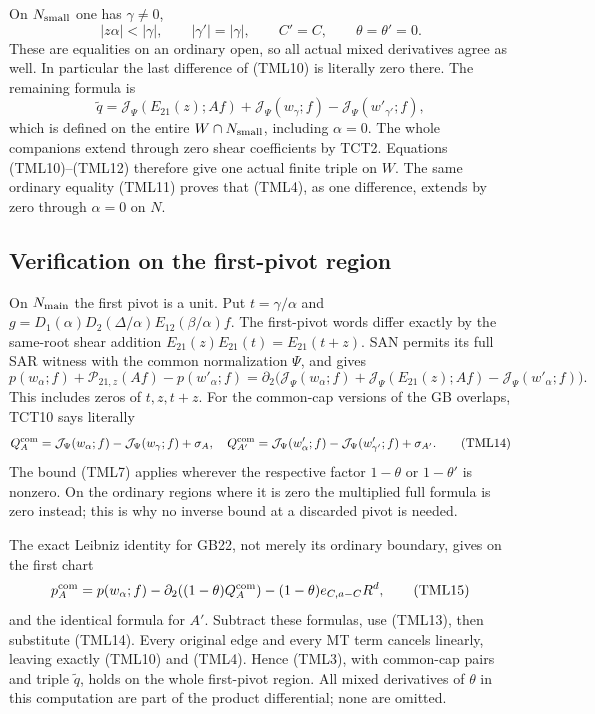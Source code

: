 On $N_{\rm small}$ one has $\gamma\ne0$,
\[
       |z\alpha|<|\gamma|,\qquad
       |\gamma'|=|\gamma|,\qquad C'=C,\qquad
                          \theta=\theta'=0.
 \tag{TML11}
\]
These are equalities on an ordinary open, so all actual mixed
derivatives agree as well.  In particular the last difference
of (TML10) is literally zero there.  The remaining formula is
\[
  \widetilde q=\mathcal J_\Psi(E_{21}(z);Af)
                  +\mathcal J_\Psi(w_\gamma;f)
                  -\mathcal J_\Psi(w'_{\gamma'};f),
 \tag{TML12}
\]
which is defined on the entire $W\cap N_{\rm small}$, including
$\alpha=0$.  The whole companions extend through zero shear
coefficients by TCT2.  Equations (TML10)--(TML12) therefore give
one actual finite triple on $W$.  The same ordinary equality
(TML11) proves that (TML4), as one difference, extends by zero
through $\alpha=0$ on $N$.

\subsection{Verification on the first-pivot region}

On $N_{\rm main}$ the first pivot is a unit.  Put
$t=\gamma/\alpha$ and
$g=D_1(\alpha)D_2(\Delta/\alpha)E_{12}(\beta/\alpha)f$.
The first-pivot words differ exactly by the same-root shear
addition $E_{21}(z)E_{21}(t)=E_{21}(t+z)$.  SAN permits its
full SAR witness with the common normalization $\Psi$, and gives
\[
 p(w_\alpha;f)+\mathcal P_{21,z}(Af)-p(w'_{\alpha};f)
   =\partial_2\bigl(\mathcal J_\Psi(w_\alpha;f)
          +\mathcal J_\Psi(E_{21}(z);Af)
          -\mathcal J_\Psi(w'_{\alpha};f)\bigr).
 \tag{TML13}
\]
This includes zeros of $t,z,t+z$.  For the common-cap versions
of the GB overlaps, TCT10 says literally
\[
 Q_A^{\rm com}=\mathcal J_\Psi(w_\alpha;f)
                   -\mathcal J_\Psi(w_\gamma;f)+\sigma_A,
 \quad
 Q_{A'}^{\rm com}=\mathcal J_\Psi(w'_{\alpha};f)
                   -\mathcal J_\Psi(w'_{\gamma'};f)+\sigma_{A'}.
 \tag{TML14}
\]
The bound (TML7) applies wherever the respective factor
$1-\theta$ or $1-\theta'$ is nonzero.  On the ordinary regions
where it is zero the multiplied full formula is zero instead;
this is why no inverse bound at a discarded pivot is needed.

The exact Leibniz identity for GB22, not merely its ordinary
boundary, gives on the first chart
\[
 p_A^{\rm com}=p(w_\alpha;f)
       -\partial_2((1-\theta)Q_A^{\rm com})
       -(1-\theta)e_{C,a-C}R^d,
 \tag{TML15}
\]
and the identical formula for $A'$.  Subtract these formulas,
use (TML13), then substitute (TML14).  Every original edge and
every MT term cancels linearly, leaving exactly (TML10) and
(TML4).  Hence (TML3), with common-cap pairs and triple
$\widetilde q$, holds on the whole first-pivot region.  All
mixed derivatives of $\theta$ in this computation are part of
the product differential; none are omitted.

